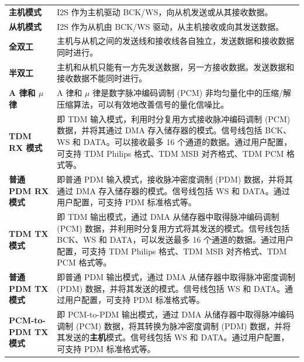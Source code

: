 \documentclass[main\_\_CN.tex]{subfiles}
\begin{document}
\begin{longtable}[c]{ R{4cm} p{10cm} }
\textbf{主机模式}     & I2S 作为主机驱动 BCK/WS，向从机发送或从其接收数据。 \\ 
\textbf{从机模式}      & I2S 作为从机由 BCK/WS 驱动，从主机接收或向其发送数据。 \\
\textbf{全双工} & 主机与从机之间的发送线和接收线各自独立，发送数据和接收数据同时进行。\\
\textbf{半双工} & 主机和从机只能有一方先发送数据，另一方接收数据。发送数据和接收数据不能同时进行。 \\
\textbf{A 律和 $\mu$ 律} & A 律和 \textrm{$\mu$} 律是数字脉冲编码调制 (PCM) 非均匀量化中的压缩/解压缩算法，可以有效地改善信号的量化信噪比。 \\
\textbf{TDM RX 模式} & 即 TDM 输入模式，利用时分复用方式接收脉冲编码调制 (PCM) 数据，并将其通过 DMA 存入储存器的模式。信号线包括 BCK、WS 和 DATA。可以接收最多 16 个通道的数据。通过用户配置，可支持 TDM Philips 格式、TDM MSB 对齐格式、TDM PCM 格式等。\\
\textbf{普通 PDM RX 模式} & 即普通 PDM 输入模式，接收脉冲密度调制 (PDM) 数据，并将其通过 DMA 存入储存器的模式。信号线包括 WS 和 DATA。通过用户配置，可支持 PDM 标准格式等。\\
\textbf{TDM TX 模式} & 即 TDM 输出模式，通过 DMA 从储存器中取得脉冲编码调制 (PCM) 数据，并利用时分复用方式将其发送的模式。信号线包括 BCK、WS 和 DATA，可以发送最多 16 个通道的数据。通过用户配置，可支持 TDM Philips 格式、TDM MSB 对齐格式、TDM PCM 格式等。\\
\textbf{普通 PDM TX 模式} & 即普通 PDM 输出模式，通过 DMA 从储存器中取得脉冲密度调制 (PDM) 数据，并将其发送的模式。信号线包括 WS 和 DATA。通过用户配置，可支持 PDM 标准格式等。\\
\textbf{PCM-to-PDM TX 模式} & 即 PCM-to-PDM 输出模式，通过 DMA 从储存器中取得脉冲编码调制 (PCM) 数据，将其转换为脉冲密度调制 (PDM) 数据，并将其发送的\textbf{主机}模式。信号线包括 WS 和 DATA。通过用户配置，可支持 PDM 标准格式等。\\
\end{longtable}
\end{document}
